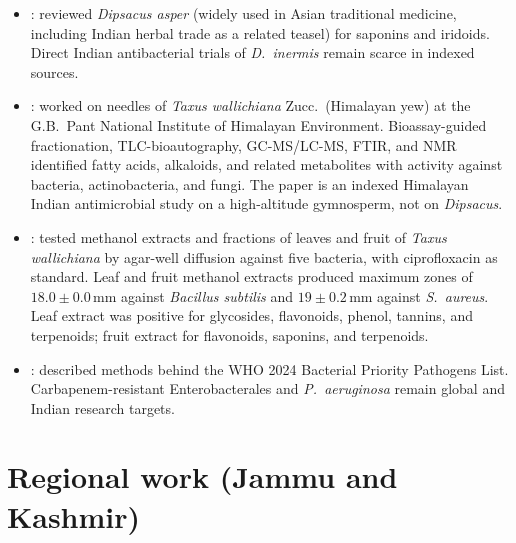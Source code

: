 \begin{itemize}
\item \citet{tao2020}: reviewed \textit{Dipsacus asper} (widely used in Asian traditional medicine, including Indian herbal trade as a related teasel) for saponins and iridoids. Direct Indian antibacterial trials of \textit{D.\ inermis} remain scarce in indexed sources.

\item \citet{adhikari2023}: worked on needles of \textit{Taxus wallichiana} Zucc.\ (Himalayan yew) at the G.B.\ Pant National Institute of Himalayan Environment. Bioassay-guided fractionation, TLC-bioautography, GC-MS/LC-MS, FTIR, and NMR identified fatty acids, alkaloids, and related metabolites with activity against bacteria, actinobacteria, and fungi. The paper is an indexed Himalayan Indian antimicrobial study on a high-altitude gymnosperm, not on \textit{Dipsacus}.

\item \citet{bhardwaj2023}: tested methanol extracts and fractions of leaves and fruit of \textit{Taxus wallichiana} by agar-well diffusion against five bacteria, with ciprofloxacin as standard. Leaf and fruit methanol extracts produced maximum zones of $18.0 \pm 0.0$\,mm against \textit{Bacillus subtilis} and $19 \pm 0.2$\,mm against \textit{S.\ aureus}. Leaf extract was positive for glycosides, flavonoids, phenol, tannins, and terpenoids; fruit extract for flavonoids, saponins, and terpenoids.

\item \citet{sati2025}: described methods behind the WHO 2024 Bacterial Priority Pathogens List. Carbapenem-resistant Enterobacterales and \textit{P.\ aeruginosa} remain global and Indian research targets.

\end{itemize}

\section{Regional work (Jammu and Kashmir)}
\label{sec:lit_regional}

